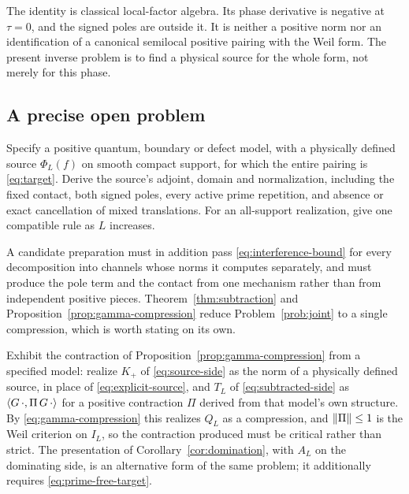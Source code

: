 The identity is classical local-factor algebra. Its phase derivative
is negative at $\tau=0$, and the signed poles are outside it. It is
neither a positive norm nor an identification of a canonical semilocal
positive pairing with the Weil form. The present inverse problem is
to find a physical source for the whole form, not merely for this phase.

\subsection{A precise open problem}
\begin{problem}\label{prob:joint}
Specify a positive quantum, boundary or defect model, with a physically
defined source $\Phi_L(f)$ on smooth compact support, for which the
entire pairing is \eqref{eq:target}. Derive the source's adjoint,
domain and normalization, including the fixed contact, both signed
poles, every active prime repetition, and absence or exact cancellation
of mixed translations. For an all-support realization, give one
compatible rule as $L$ increases.
\end{problem}

A candidate preparation must in addition pass
\eqref{eq:interference-bound} for every decomposition into channels whose
norms it computes separately, and must produce the pole term and the
contact from one mechanism rather than from independent positive pieces.
Theorem~\ref{thm:subtraction} and Proposition~\ref{prop:gamma-compression}
reduce Problem~\ref{prob:joint} to a single compression, which is worth
stating on its own.

\begin{problem}\label{prob:subtraction}
Exhibit the contraction of Proposition~\ref{prop:gamma-compression} from a
specified model: realize $K_+$ of \eqref{eq:source-side} as the norm of a
physically defined source, in place of \eqref{eq:explicit-source}, and $T_L$ of
\eqref{eq:subtracted-side} as $\langle G\,\cdot,\Pi\,G\,\cdot\rangle$ for a positive
contraction $\Pi$ derived from that model's own structure. By
\eqref{eq:gamma-compression} this realizes $Q_L$ as a compression, and
$\lVert \Pi\rVert\leq1$ is the Weil criterion on $I_L$, so the contraction produced
must be critical rather than strict. The presentation of
Corollary~\ref{cor:domination}, with $A_L$ on the dominating side, is an
alternative form of the same problem; it additionally requires
\eqref{eq:prime-free-target}.
\end{problem}

